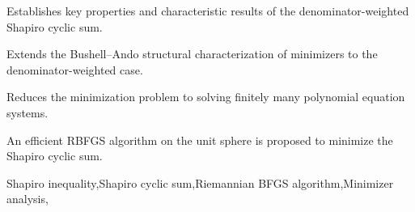 \documentclass[a4paper,fleqn,numbers]{cas-sc}
\begin{document}
	\nonumnote{}
	
	\begin{abstract}
		This paper investigates the extremal properties and solution strategies of the \textbf{denominator-weighted Shapiro cyclic sum}. First, the fundamental properties of the \textbf{Shapiro cyclic sum} are derived, the structural characteristics and piecewise patterns of the minimizer of this cyclic sum are explored, and a general method for deriving the minimum of this cyclic sum is presented. To address the issue of extremely complex algebraic computations in high-dimensional cases, this paper transforms the constrained optimization problem into a Riemannian manifold optimization problem on the unit sphere through variable substitution, and proposes an efficient \textbf{Riemannian BFGS (RBFGS) algorithm} equipped with an oscillatory solution detection and restart mechanism. Numerical experiments demonstrate that the proposed algorithm exhibits good convergence and efficiency in verifying counterexamples to the classical Shapiro inequality and solving for the minimum of its denominator-weighted form.
	\end{abstract}
	
	
	\begin{highlights}
		\item Establishes key properties and characteristic results of the denominator-weighted Shapiro cyclic sum.
		
		\item Extends the Bushell–Ando structural characterization of minimizers to the denominator-weighted case.
		
		\item Reduces the minimization problem to solving finitely many polynomial equation systems.
		
		\item An efficient RBFGS algorithm on the unit sphere is proposed to minimize the Shapiro cyclic sum.
	\end{highlights}
	
	
	\begin{keywords}
		Shapiro inequality\sep Shapiro cyclic sum\sep Riemannian BFGS algorithm\sep Minimizer analysis\sep
	\end{keywords}
	
\end{document}
